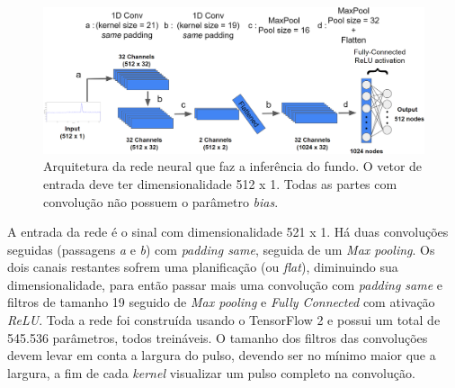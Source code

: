 \documentclass[a4paper,12pt,oneside]{book}
\begin{document}


\begin{figure}[H]
    \centering
    \includegraphics[scale = 0.28]{figs/Source to only bkg.png}
    \caption{Arquitetura da rede neural que faz a inferência do fundo. O vetor de entrada deve ter dimensionalidade 512 x 1. Todas as partes com convolução não possuem o parâmetro \textit{bias}.}
    \label{fig:arq_source_to_bkg}
\end{figure}

\par A entrada da rede é o sinal com dimensionalidade 521 x 1. Há duas convoluções seguidas (passagens \textit{a} e \textit{b}) com \textit{padding same}, seguida de um \textit{Max pooling}. Os dois canais restantes sofrem uma planificação (ou \textit{flat}), diminuindo sua dimensionalidade, para então passar mais uma convolução com \textit{padding same} e filtros de tamanho 19 seguido de \textit{Max pooling} e \textit{Fully Connected} com ativação \textit{ReLU}. Toda a rede foi construída usando o TensorFlow 2 e possui um total de 545.536 parâmetros, todos treináveis. O tamanho dos filtros das convoluções devem levar em conta a largura do pulso, devendo ser no mínimo maior que a largura, a fim de cada \textit{kernel} visualizar um pulso completo na convolução.
\end{document}
